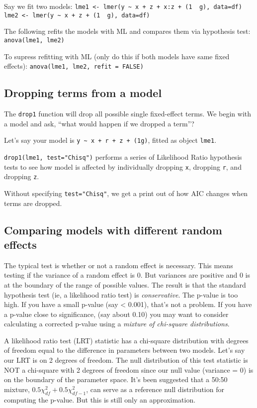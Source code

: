 \documentclass[
]{article}
\begin{document}
Say we fit two models:
\texttt{lme1\ \textless{}-\ lmer(y\ \textasciitilde{}\ x\ +\ z\ +\ x:z\ +\ (1\ \textbar{}\ g),\ data=df)}
\texttt{lme2\ \textless{}-\ lmer(y\ \textasciitilde{}\ x\ +\ z\ +\ (1\ \textbar{}\ g),\ data=df)}

The following refits the models with ML and compares them via hypothesis
test: \texttt{anova(lme1,\ lme2)}

To supress refitting with ML (only do this if both models have same
fixed effects): \texttt{anova(lme1,\ lme2,\ refit\ =\ FALSE)}

\subsection{Dropping terms from a
model}\label{dropping-terms-from-a-model}

The \texttt{drop1} function will drop all possible single fixed-effect
terms. We begin with a model and ask, ``what would happen if we dropped
a term''?

Let's say your model is
\texttt{y\ \textasciitilde{}\ x\ +\ r\ +\ z\ +\ (1\textbar{}g)}, fitted
as object \texttt{lme1}.

\texttt{drop1(lme1,\ test="Chisq")} performs a series of Likelihood
Ratio hypothesis tests to see how model is affected by individually
dropping \texttt{x}, dropping \texttt{r}, and dropping \texttt{z}.

Without specifying \texttt{test="Chisq"}, we get a print out of how AIC
changes when terms are dropped.

\subsection{Comparing models with different random
effects}\label{comparing-models-with-different-random-effects}

The typical test is whether or not a random effect is necessary. This
means testing if the variance of a random effect is 0. But variances are
positive and 0 is at the boundary of the range of possible values. The
result is that the standard hypothesis test (ie, a likelihood ratio
test) is \emph{conservative}. The p-value is too high. If you have a
small p-value (say \textless{} 0.001), that's not a problem. If you have
a p-value close to significance, (say about 0.10) you may want to
consider calculating a corrected p-value using a \emph{mixture of
chi-square distributions}.

A likelihood ratio test (LRT) statistic has a chi-square distribution
with degrees of freedom equal to the difference in parameters between
two models. Let's say our LRT is on 2 degrees of freedom. The null
distribution of this test statistic is NOT a chi-square with 2 degrees
of freedom since our null value (variance = 0) is on the boundary of the
parameter space. It's been suggested that a 50:50 mixture,
\(0.5\chi_{df}^{2} + 0.5\chi_{df-1}^{2}\), can serve as a reference null
distribution for computing the p-value. But this is still only an
approximation.
\end{document}
